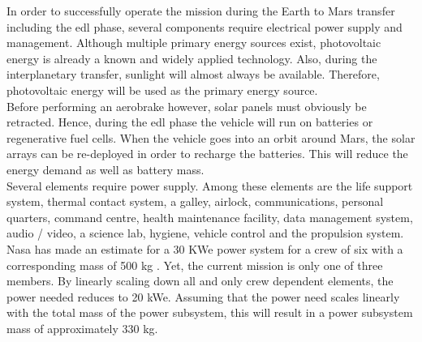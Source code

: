 In order to successfully operate the mission during the Earth to Mars transfer including the \gls{edl} phase, several components require electrical power supply and management. Although multiple primary energy sources exist, photovoltaic energy is already a known and widely applied technology. Also, during the interplanetary transfer, sunlight will almost always be available. Therefore, photovoltaic energy will be used as the primary energy source.\\
 
Before performing an aerobrake however, solar panels must obviously be retracted. Hence, during the \gls{edl} phase the vehicle will run on batteries or regenerative fuel cells. When the vehicle goes into an orbit around Mars, the solar arrays can be re-deployed in order to recharge the batteries. This will reduce the energy demand as well as battery mass.\\

Several elements require power supply. Among these elements are the life support system, thermal contact system, a galley, airlock, communications, personal quarters, command centre, health maintenance facility, data management system, audio / video, a science lab, hygiene, vehicle control and the propulsion system. Nasa has made an estimate for a 30 KWe power system for a crew of six with a corresponding mass of 500 kg \cite{Hoffman1997}. Yet, the current mission is only one of three members. By linearly scaling down all and only crew dependent elements, the power needed reduces to 20 kWe. Assuming that the power need scales linearly with the total mass of the power subsystem, this will result in a power subsystem mass of approximately 330 kg.\\







